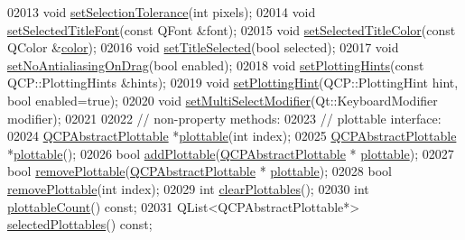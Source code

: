 \begin{DoxyCode}
02013   \textcolor{keywordtype}{void} \hyperlink{a00116_a4dc31241d7b09680950e19e5f971ed93}{setSelectionTolerance}(\textcolor{keywordtype}{int} pixels);
02014   \textcolor{keywordtype}{void} \hyperlink{a00116_a2face1cc6d467f27aa1a6f3ba5ba112d}{setSelectedTitleFont}(\textcolor{keyword}{const} QFont &font);
02015   \textcolor{keywordtype}{void} \hyperlink{a00116_ad0897d7ba31a3994d7323f568cdcd2d8}{setSelectedTitleColor}(\textcolor{keyword}{const} QColor &\hyperlink{a00116_ae35093fbf4f645dcefd930ca8c68b622}{color});
02016   \textcolor{keywordtype}{void} \hyperlink{a00116_aa89e06c04804ff2a0994ccb1aa80d131}{setTitleSelected}(\textcolor{keywordtype}{bool} selected);
02017   \textcolor{keywordtype}{void} \hyperlink{a00116_a775bdcb6329d44701aeaa6135b0e5265}{setNoAntialiasingOnDrag}(\textcolor{keywordtype}{bool} enabled);
02018   \textcolor{keywordtype}{void} \hyperlink{a00116_a94a33cbdadbbac5934843508bcfc210d}{setPlottingHints}(\textcolor{keyword}{const} QCP::PlottingHints &hints);
02019   \textcolor{keywordtype}{void} \hyperlink{a00116_a3b7c97bb6c16464e9e15190c07abe9a9}{setPlottingHint}(QCP::PlottingHint hint, \textcolor{keywordtype}{bool} enabled=\textcolor{keyword}{true});
02020   \textcolor{keywordtype}{void} \hyperlink{a00116_a8fc96e3b5138a06759a2a90c166df516}{setMultiSelectModifier}(Qt::KeyboardModifier modifier);
02021   
02022   \textcolor{comment}{// non-property methods:}
02023   \textcolor{comment}{// plottable interface:}
02024   \hyperlink{a00024}{QCPAbstractPlottable} *\hyperlink{a00116_a5c198d46ea2a2255a1b73e2c590f0364}{plottable}(\textcolor{keywordtype}{int} index);
02025   \hyperlink{a00024}{QCPAbstractPlottable} *\hyperlink{a00116_a5c198d46ea2a2255a1b73e2c590f0364}{plottable}();
02026   \textcolor{keywordtype}{bool} \hyperlink{a00116_ab7ad9174f701f9c6f64e378df77927a6}{addPlottable}(\hyperlink{a00024}{QCPAbstractPlottable} *
      \hyperlink{a00116_a5c198d46ea2a2255a1b73e2c590f0364}{plottable});
02027   \textcolor{keywordtype}{bool} \hyperlink{a00116_af3dafd56884208474f311d6226513ab2}{removePlottable}(\hyperlink{a00024}{QCPAbstractPlottable} *
      \hyperlink{a00116_a5c198d46ea2a2255a1b73e2c590f0364}{plottable});
02028   \textcolor{keywordtype}{bool} \hyperlink{a00116_af3dafd56884208474f311d6226513ab2}{removePlottable}(\textcolor{keywordtype}{int} index);
02029   \textcolor{keywordtype}{int} \hyperlink{a00116_a9a409bb3201878adb7ffba1c89c4e004}{clearPlottables}();
02030   \textcolor{keywordtype}{int} \hyperlink{a00116_a2dbfbf15dc38713f9a1c445a3dd2e989}{plottableCount}() \textcolor{keyword}{const};
02031   QList<QCPAbstractPlottable*> \hyperlink{a00116_a6721b8c689bb7f2f400987e580508fe8}{selectedPlottables}() \textcolor{keyword}{const};

\end{DoxyCode}
